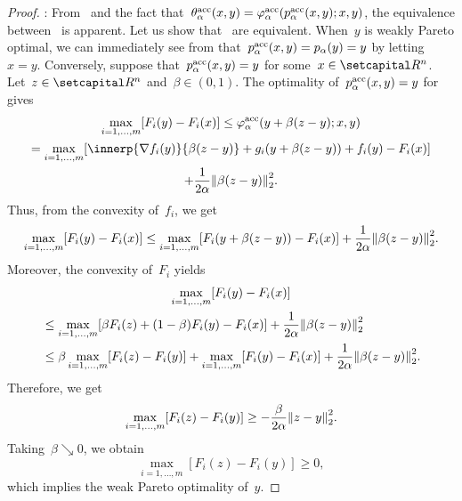 \documentclass[../main]{subfiles}
\begin{document}
\begin{proof}
    : From~ and the fact that~$\theta^{\mathrm{acc}}_\alpha(x, y) = \varphi^{\mathrm{acc}}_\alpha(p^{\mathrm{acc}}_\alpha(x, y); x, y)$, the equivalence between~ is apparent.
    Let us show that~ are equivalent.
    When~$y$ is weakly Pareto optimal, we can immediately see from  that~$p^{\mathrm{acc}}_\alpha(x, y) = p_\alpha(y) = y$ by letting~$x = y$.
    Conversely, suppose that~$p^{\mathrm{acc}}_\alpha(x, y) = y$ for some~$x \in \setR^n$.
    Let~$z \in \setR^n$ and~$\beta \in (0, 1)$.
    The optimality of~$p^{\mathrm{acc}}_\alpha(x, y) = y$ for~ gives
    \begin{multline}
        \max_{i = 1, \dots, m} [ F_i(y) - F_i(x) ] \le \varphi^\acc_\alpha(y + \beta (z - y); x, y) \\
        = \max_{i = 1, \dots, m} [ \innerp{\nabla f_i(y)}{\beta (z - y)} + g_i(y + \beta (z - y)) + f_i(y) - F_i(x) ] \\
        + \frac{1}{2 \alpha} \norm*{\beta (z - y)}_2^2
        .\end{multline}
    Thus, from the convexity of~$f_i$, we get
    \begin{equation}
        \max_{i = 1, \dots, m}[ F_i(y) - F_i(x) ] \le \max_{i = 1, \dots, m}[ F_i(y + \beta (z - y)) - F_i(x) ] + \frac{1}{2 \alpha} \norm*{\beta (z - y)}_2^2
        .\end{equation}
    Moreover, the convexity of~$F_i$ yields
    \begin{multline}
        \max_{i = 1, \dots, m}[ F_i(y) - F_i(x) ] \\
        \begin{split}
            &\le \max_{i = 1, \dots, m}[ \beta F_i(z) + (1 - \beta) F_i(y) - F_i(x) ] + \frac{1}{2 \alpha} \norm*{\beta (z - y) }_2^2 \\
            &\le \beta \max_{i = 1, \dots, m}[  F_i(z) - F_i(y) ] + \max_{i = 1, \dots, m}[ F_i(y) - F_i(x) ] + \frac{1}{2 \alpha} \norm*{\beta (z - y) }_2^2
            .\end{split}
    \end{multline}
    Therefore, we get
    \begin{equation}
        \max_{i = 1, \dots, m}[  F_i(z) - F_i(y)  ] \ge - \frac{\beta}{2 \alpha} \norm*{z - y }_2^2
        .\end{equation}
    Taking~$\beta \searrow 0$, we obtain
    \begin{equation}
        \max_{i = 1, \dots, m}[  F_i(z) - F_i(y)  ] \ge 0
        ,\end{equation}
    which implies the weak Pareto optimality of~$y$.


\end{proof}
\end{document}
